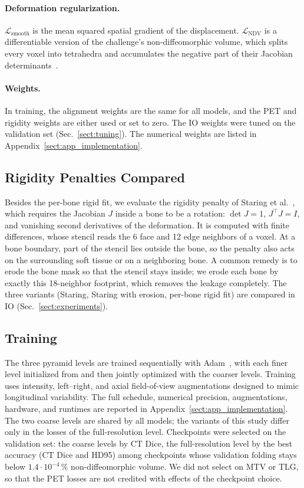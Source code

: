 \paragraph{Deformation regularization.}
$\mathcal{L}_{\mathrm{smooth}}$ is the mean squared spatial gradient of the displacement.
$\mathcal{L}_{\mathrm{NDV}}$ is a differentiable version of the challenge's non-diffeomorphic volume, which splits every voxel into tetrahedra and accumulates the negative part of their Jacobian determinants~\cite{Liu2024}.

\paragraph{Weights.}
In training, the alignment weights are the same for all models, and the PET and rigidity weights are either used or set to zero.
The IO weights were tuned on the validation set (Sec.~\ref{sect:tuning}).
The numerical weights are listed in Appendix~\ref{sect:app_implementation}.

\subsection{Rigidity Penalties Compared}
\label{sect:rigidity_methods}

Besides the per-bone rigid fit, we evaluate the rigidity penalty of Staring et al.~\cite{ref_rigidity_3_staring}, which requires the Jacobian $J$ inside a bone to be a rotation: $\det J = 1$, $J^{\top}J = I$, and vanishing second derivatives of the deformation.
It is computed with finite differences, whose stencil reads the 6 face and 12 edge neighbors of a voxel.
At a bone boundary, part of the stencil lies outside the bone, so the penalty also acts on the surrounding soft tissue or on a neighboring bone.
A common remedy is to erode the bone mask so that the stencil stays inside; we erode each bone by exactly this 18-neighbor footprint, which removes the leakage completely.
The three variants (Staring, Staring with erosion, per-bone rigid fit) are compared in IO (Sec.~\ref{sect:experiments}).

\subsection{Training}
\label{sect:training}

The three pyramid levels are trained sequentially with Adam~\cite{ref_adam}, with each finer level initialized from and then jointly optimized with the coarser levels.
Training uses intensity, left--right, and axial field-of-view augmentations designed to mimic longitudinal variability.
The full schedule, numerical precision, augmentations, hardware, and runtimes are reported in Appendix~\ref{sect:app_implementation}.
The two coarse levels are shared by all models; the variants of this study differ only in the losses of the full-resolution level.
Checkpoints were selected on the validation set: the coarse levels by CT Dice, the full-resolution level by the best accuracy (CT Dice and HD95) among checkpoints whose validation folding stays below $1.4\cdot10^{-4}\,\%$ non-diffeomorphic volume.
We did not select on MTV or TLG, so that the PET losses are not credited with effects of the checkpoint choice.

